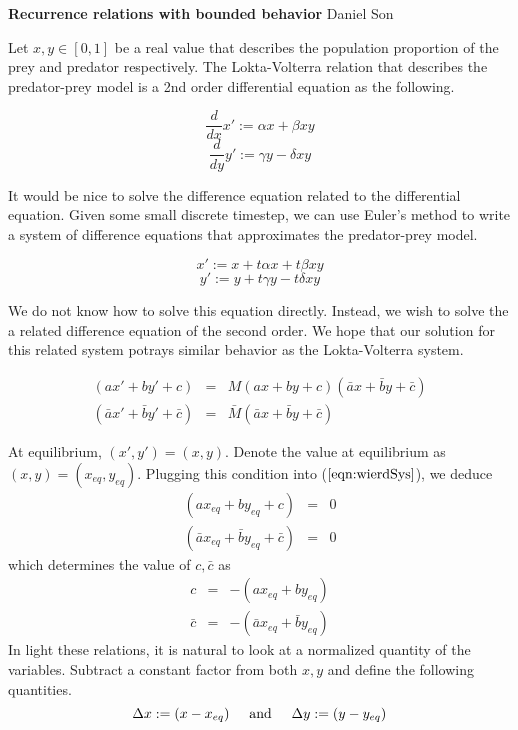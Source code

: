 \documentclass{article}
\newcommand{\textAnd}{
    {
        \hspace{5mm}
        \textrm{and}
        \hspace{5mm}
    }
}
\begin{document}
\begin{center}
    \Large
    \textbf{Recurrence relations with bounded behavior}
    \large
    Daniel Son
\end{center}

Let $x, y \in [0, 1]$ be a real value that describes 
the population proportion of the prey and predator respectively. 
The Lokta-Volterra relation that describes the predator-prey 
model is a 2nd order differential equation as the following. 

\[
\frac d {dx} x' := \alpha x + \beta xy
\]
\[
\frac d {dy} y' := \gamma y - \delta xy
\]

It would be nice to solve the difference equation 
related to the differential equation. Given some 
small discrete timestep, we can use Euler's method to 
write a system of difference equations that approximates the predator-prey model.  

\[
x' := x + t\alpha x + t\beta xy
\]
\[
y' := y + t\gamma y - t\delta xy
\]

We do not know how to solve this equation directly. Instead, 
we wish to solve the a related difference equation of the second order. 
We hope that our solution for this related system potrays similar 
behavior as the Lokta-Volterra system. 

\begin{eqnarray}
    (ax' + by' + c) & = &  M (ax + by + c)  (\bar ax + \bar by + \bar c) \nonumber\\
    \label{eqn:wierdSys}
    (\bar ax' + \bar by' + \bar c) & = &  \bar M (\bar ax + \bar by + \bar c)
\end{eqnarray}

At equilibrium, $(x', y') = (x, y)$. 
Denote the value at equilibrium as $(x, y) = (x_{eq}, y_{eq})$. 
Plugging this condition into 
($\ref{eqn:wierdSys}$), we deduce 
\begin{eqnarray*}
    (ax_{eq} + by_{eq} + c) & = & 0 \\ 
(\bar ax_{eq} +\bar by_{eq} + \bar c) & = & 0 
\end{eqnarray*}
which determines the value of $c, \bar c $ as 
\begin{eqnarray*}
    c & = &-( ax_{eq} + by_{eq}) \\ 
 \bar c & = & -(\bar ax_{eq} +\bar by_{eq} )
\end{eqnarray*}
In light these relations, it is natural to look at a 
normalized quantity of the variables. Subtract 
a constant factor from both $x, y$ and define the following 
quantities. 
\[
    \Delta  x := (x - x_{eq}) 
    \textAnd 
    \Delta y := (y - y_{eq})
\]
\end{document}
